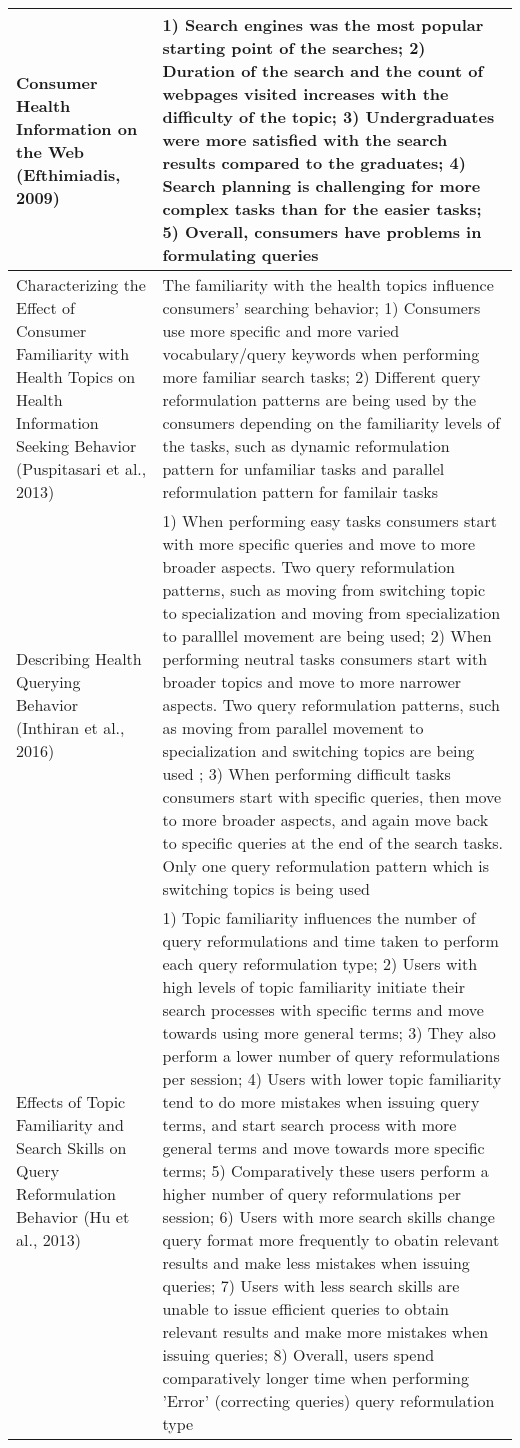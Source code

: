 \documentclass[]{article}
\begin{document}
\begin{center}
\begin{longtable}{||p{4cm} | p{10cm}||}
Consumer Health Information on the Web (Efthimiadis, 2009) & 1) Search engines was the most popular starting point of the searches; 2) Duration of the search and the count of webpages visited increases with the difficulty of the topic; 3) Undergraduates were more satisfied with the search results compared to the graduates; 4) Search planning is challenging for more complex tasks than for the easier tasks; 5) Overall, consumers have problems in formulating queries \\ \hline Characterizing the Effect of Consumer Familiarity with Health Topics on Health Information Seeking Behavior (Puspitasari et al., 2013) & The familiarity with the health topics influence consumers’ searching behavior; 1) Consumers use more specific and more varied vocabulary/query keywords when performing more familiar search tasks; 2) Different query reformulation patterns are being used by the consumers depending on the familiarity levels of the tasks, such as dynamic reformulation pattern for unfamiliar tasks and parallel reformulation pattern for familair tasks \\ \hline Describing Health Querying Behavior (Inthiran et al., 2016) & 1) When performing easy tasks consumers start with more specific queries and move to more broader aspects. Two query reformulation patterns, such as moving from switching topic to specialization and moving from specialization to paralllel movement are being used; 2) When performing neutral tasks consumers start with broader topics and move to more narrower aspects.  Two query reformulation patterns, such as moving from parallel movement to specialization and switching topics are being used ; 3) When performing difficult tasks consumers start with specific queries, then move to more broader aspects, and again move back to specific queries at the end of the search tasks. Only one query reformulation pattern which is switching topics is being used \\ \hline Effects of Topic Familiarity and Search Skills on Query Reformulation Behavior (Hu et al., 2013) & 1) Topic familiarity influences the number of query reformulations and time taken to perform each query reformulation type; 2) Users with high levels of topic familiarity initiate their search processes with specific terms and move towards using more general terms; 3) They also perform a lower number of query reformulations per session; 4) Users with lower topic familiarity tend to do more mistakes when issuing query terms, and start search process with more general terms and move towards more specific terms; 5) Comparatively these users perform a higher number of query reformulations per session; 6) Users with more search skills change query format more frequently to obatin relevant results and make less mistakes when issuing queries; 7) Users with less search skills are unable to issue efficient queries to obtain relevant results and make more mistakes when issuing queries; 8) Overall, users spend comparatively longer time when performing 'Error' (correcting queries) query reformulation type \\      		
		\hline
	\end{longtable}	
	

\end{center}
\end{document}
